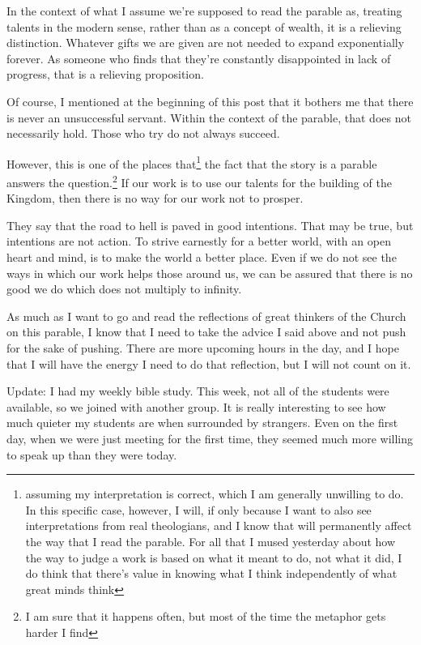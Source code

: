 \documentclass[12pt]{article}[titlepage]
\newcommand{\1}{\={a}}
\newcommand{\2}{\={e}}
\newcommand{\3}{\={\i}}
\newcommand{\4}{\=o}
\newcommand{\5}{\=u}
\newcommand{\6}{\={A}}
\renewcommand{\,}{\textsuperscript{,}}
\begin{document}
In the context of what I assume we're supposed to read the parable as, treating talents in the modern sense, rather than as a concept of wealth, it is a relieving distinction.
Whatever gifts we are given are not needed to expand exponentially forever.
As someone who finds that they're constantly disappointed in lack of progress, that is a relieving proposition.

Of course, I mentioned at the beginning of this post that it bothers me that there is never an unsuccessful servant.
Within the context of the parable, that does not necessarily hold.
Those who try do not always succeed.

However, this is one of the places that\footnote{assuming my interpretation is correct, which I am generally unwilling to do.
In this specific case, however, I will, if only because I want to also see interpretations from real theologians, and I know that will permanently affect the way that I read the parable.
For all that I mused yesterday about how the way to judge a work is based on what it meant to do, not what it did, I do think that there's value in knowing what I think independently of what great minds think}
the fact that the story is a parable answers the question.\footnote{I am sure that it happens often, but most of the time the metaphor gets harder I find}
If our work is to use our talents for the building of the Kingdom, then there is no way for our work not to prosper.

They say that the road to hell is paved in good intentions.
That may be true, but intentions are not action.
To strive earnestly for a better world, with an open heart and mind, is to make the world a better place.
Even if we do not see the ways in which our work helps those around us, we can be assured that there is no good we do which does not multiply to infinity.

As much as I want to go and read the reflections of great thinkers of the Church on this parable, I know that I need to take the advice I said above and not push for the sake of pushing.
There are more upcoming hours in the day, and I hope that I will have the energy I need to do that reflection, but I will not count on it.

Update: I had my weekly bible study.
This week, not all of the students were available, so we joined with another group.
It is really interesting to see how much quieter my students are when surrounded by strangers.
Even on the first day, when we were just meeting for the first time, they seemed much more willing to speak up than they were today.
\end{document}
